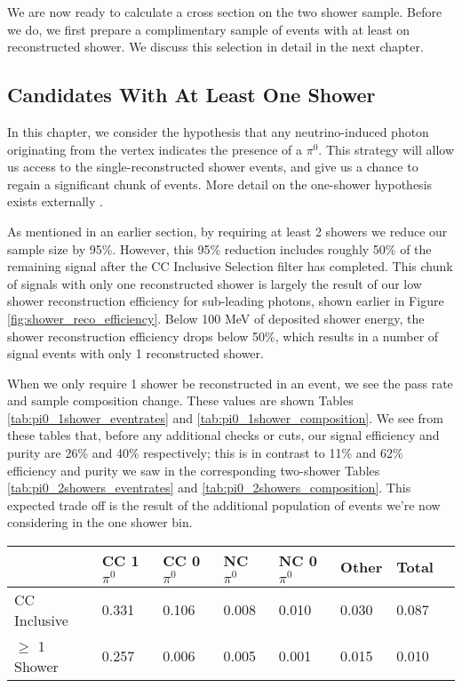 \par We are now ready to calculate a cross section on the two shower sample.  Before we do, we first prepare a complimentary sample of events with at least on reconstructed shower. We discuss this selection in detail in the next chapter.


\clearpage
\subsection{Candidates With At Least One Shower}
In this chapter, we consider the hypothesis that any neutrino-induced photon originating from the vertex indicates the presence of a $\pi^0$.  This strategy will allow us access to the single-reconstructed shower events, and give us a chance to regain a significant chunk of events. More detail on the one-shower hypothesis exists externally \cite{bib:timb_singleshower}.
\par As mentioned in an earlier section, by requiring at least 2 showers we reduce our sample size by 95\%.  However, this 95\% reduction includes roughly 50\% of the remaining signal after the CC Inclusive Selection filter has completed. This chunk of signals with only one reconstructed shower is largely the result of our low shower reconstruction efficiency for sub-leading photons, shown earlier in Figure \ref{fig:shower_reco_efficiency}. Below 100 MeV of deposited shower energy, the shower reconstruction efficiency drops below 50\%, which results in a number of signal events with only 1 reconstructed shower. 
\par When we only require 1 shower be reconstructed in an event, we see the pass rate and sample composition change.  These values are shown Tables \ref{tab:pi0_1shower_eventrates} and \ref{tab:pi0_1shower_composition}. We see from these tables that, before any additional checks or cuts, our signal efficiency and purity are 26\% and 40\% respectively; this is in contrast to 11\% and 62\% efficiency and purity we saw in the corresponding two-shower Tables \ref{tab:pi0_2showers_eventrates} and \ref{tab:pi0_2showers_composition}. This expected trade off is the result of the additional population of events we're now considering in the one shower bin.  

\begin{table}[H]
\centering
{}
 \begin{tabular}{| l | l | l |l|l|l|l|l|}
 \hline
 & CC 1$\pi^0$ & CC 0$\pi^0$ & NC $\pi^0$ & NC 0$\pi^0$ & Other & Total \\ [0.1ex] \hline
CC Inclusive & 0.331 & 0.106 & 0.008 & 0.010 & 0.030 & 0.087 \\
$\geq$ 1 Shower & 0.257 & 0.006 & 0.005 & 0.001 & 0.015 & 0.010 \\ \hline
\end{tabular}
\end{table}

